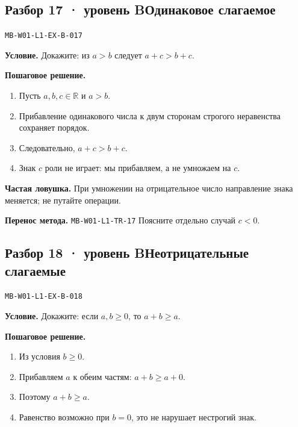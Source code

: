 \documentclass[11pt,a4paper,openany]{book}
\newcommand{\mtag}[1]{\textsf{\small\color{mbaccent}\bfseries #1}}
\newcommand{\muid}[1]{\texttt{\footnotesize #1}}
\begin{document}
\subsection*{\mtag{Разбор 17 · уровень B}\quad Одинаковое слагаемое}\hypertarget{MB-W01-L1-EX-B-017}{}

\muid{MB-W01-L1-EX-B-017}\par

\begin{keybox}\textbf{Условие.} Докажите: из $a>b$ следует $a+c>b+c$.\end{keybox}

\textbf{Пошаговое решение.}\par
\begin{enumerate}[label=\arabic*),leftmargin=*,itemsep=3pt,topsep=4pt]
\item Пусть $a,b,c\in\mathbb R$ и $a>b$.
\item Прибавление одинакового числа к двум сторонам строгого неравенства сохраняет порядок.
\item Следовательно, $a+c>b+c$.
\item Знак $c$ роли не играет: мы прибавляем, а не умножаем на $c$.
\end{enumerate}


\begin{learnbox}\textbf{Частая ловушка.} При умножении на отрицательное число направление знака меняется; не путайте операции.\par \textbf{Перенос метода.} \muid{MB-W01-L1-TR-17} Поясните отдельно случай $c<0$.\end{learnbox}

\subsection*{\mtag{Разбор 18 · уровень B}\quad Неотрицательные слагаемые}\hypertarget{MB-W01-L1-EX-B-018}{}

\muid{MB-W01-L1-EX-B-018}\par

\begin{keybox}\textbf{Условие.} Докажите: если $a,b\ge0$, то $a+b\ge a$.\end{keybox}

\textbf{Пошаговое решение.}\par
\begin{enumerate}[label=\arabic*),leftmargin=*,itemsep=3pt,topsep=4pt]
\item Из условия $b\ge0$.
\item Прибавляем $a$ к обеим частям: $a+b\ge a+0$.
\item Поэтому $a+b\ge a$.
\item Равенство возможно при $b=0$, это не нарушает нестрогий знак.
\end{enumerate}
\end{document}
